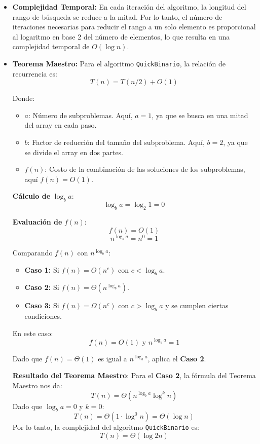 \documentclass[twoside,spanish]{elsarticle}
\begin{document}
\begin{itemize}
    \item \textbf{Complejidad Temporal:} En cada iteración del algoritmo, la longitud del rango de búsqueda se reduce a la mitad. Por lo tanto, el número de iteraciones necesarias para reducir el rango a un solo elemento es proporcional al logaritmo en base 2 del número de elementos, lo que resulta en una complejidad temporal de \(O(\log n)\).
    
    \item \textbf{Teorema Maestro:} Para el algoritmo \texttt{QuickBinario}, la relación de recurrencia es:
        \[
        T(n) = T(n/2) + O(1)
        \]
        
        Donde:
        \begin{itemize}
            \item \(a\): Número de subproblemas. Aquí, \(a = 1\), ya que se busca en una mitad del array en cada paso.
            \item \(b\): Factor de reducción del tamaño del subproblema. Aquí, \(b = 2\), ya que se divide el array en dos partes.
            \item \(f(n)\): Costo de la combinación de las soluciones de los subproblemas, aquí \(f(n) = O(1)\).
        \end{itemize}

        \textbf{Cálculo de} \( \log_b a \):
        \[
        \log_b a = \log_2 1 = 0
        \]

        \textbf{Evaluación de} \( f(n) \):
        \[
        f(n) = O(1)
        \]
        \[
        n^{\log_b a} = n^0 = 1
        \]

        Comparando \( f(n) \) con \( n^{\log_b a} \):
        \begin{itemize}
            \item \textbf{Caso 1:} Si \( f(n) = O(n^c) \) con \( c < \log_b a \).
            \item \textbf{Caso 2:} Si \( f(n) = \Theta(n^{\log_b a}) \).
            \item \textbf{Caso 3:} Si \( f(n) = \Omega(n^c) \) con \( c > \log_b a \) y se cumplen ciertas condiciones.
        \end{itemize}

        En este caso:
        \[
        f(n) = O(1) \text{ y } n^{\log_b a} = 1
        \]

        Dado que \( f(n) = \Theta(1) \) es igual a \( n^{\log_b a} \), aplica el \textbf{Caso 2}.

        \textbf{Resultado del Teorema Maestro}:
        Para el \textbf{Caso 2}, la fórmula del Teorema Maestro nos da:
        \[
        T(n) = \Theta(n^{\log_b a} \log^k n)
        \]
        Dado que \( \log_b a = 0 \) y \( k = 0 \):
        \[
        T(n) = \Theta(1 \cdot \log^0 n) = \Theta(\log n)
        \]
        Por lo tanto, la complejidad del algoritmo \texttt{QuickBinario} es:
        \[
        T(n) = \Theta(\log2 n)
        \]
\end{itemize}
\end{document}
